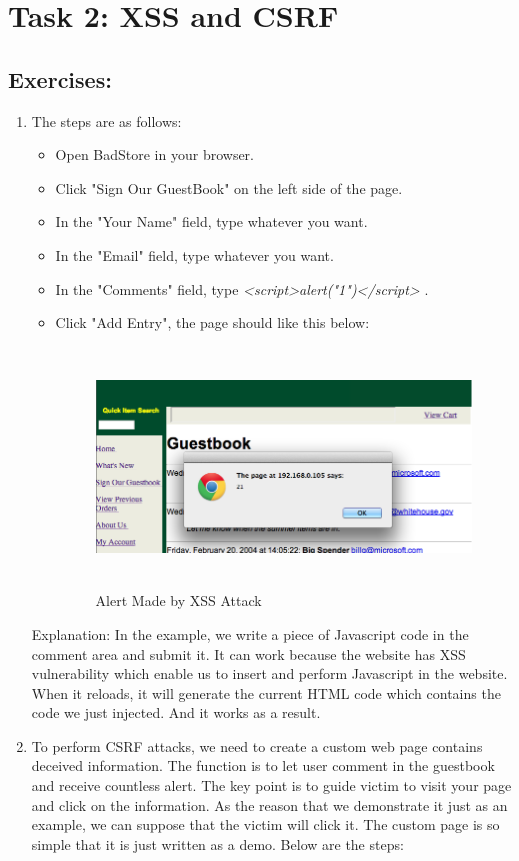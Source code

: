 \section*{Task 2: XSS and CSRF}
\subsection*{Exercises:}
\begin{enumerate}
\item The steps are as follows: 
	\begin{itemize}
		\item Open BadStore in your browser.
		\item Click "Sign Our GuestBook" on the left side of the page.
		\item In the "Your Name" field, type whatever you want.
		\item In the "Email" field, type whatever you want.
		\item In the "Comments" field, type \textit{<script>alert("1")</script>} .
		\item Click "Add Entry", the page should like this below:
		\par
		\begin{figure}[h!]
			\caption{Alert Made by XSS Attack}
			\begin{center}\includegraphics[height=2.5in]{xss}
			\end{center}
		\end{figure}
	\end{itemize}
	\indent Explanation: In the example, we write a piece of Javascript code in the comment area and submit it. It can work because the website has XSS vulnerability which enable us to insert and perform Javascript in the website. When it reloads, it will generate the current HTML code which contains the code we just injected. And it works as a result.
	\item To perform CSRF attacks, we need to create a custom web page contains deceived information. The function is to let user comment in the guestbook and receive countless alert. The key point is to guide victim to visit your page and click on the information. As the reason that we demonstrate it just as an example, we can suppose that the victim will click it. The custom page is so simple that it is just written as a demo. Below are the steps:

\end{enumerate}
